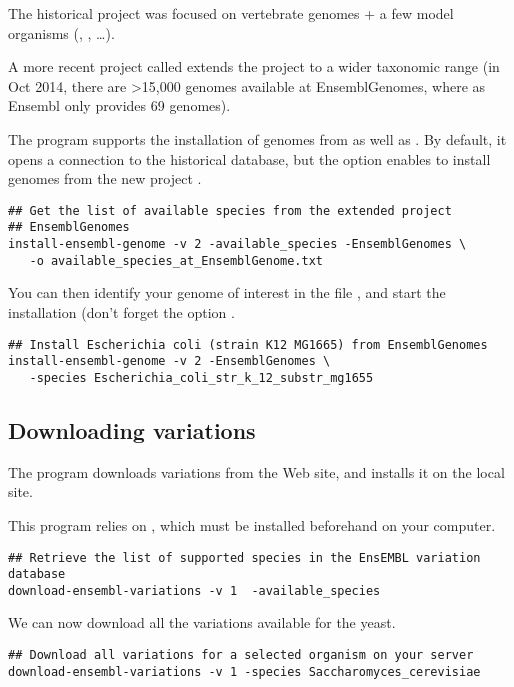 The historical \ensembl project 
was focused on vertebrate genomes + a few model organisms
(, ,
\ldots).

A more recent project called \ensemblgenomes
{} extends the \ensembl project to a
wider taxonomic range (in Oct 2014, there are >15,000 genomes
available at EnsemblGenomes, where as Ensembl only provides 69
genomes).

The program  supports the installation
of genomes from \ensembl as well as \ensemblgenomes. By default, it
opens a connection to the historical \ensembl database, but the option
 enables to install genomes from the new
project \ensemblgenomes.

\begin{lstlisting}
## Get the list of available species from the extended project
## EnsemblGenomes
install-ensembl-genome -v 2 -available_species -EnsemblGenomes \
   -o available_species_at_EnsemblGenome.txt
\end{lstlisting}

You can then identify your genome of interest in the file
, and start the
installation (don't forget the option \option{-ensembl\_genomes}.

\begin{lstlisting}
## Install Escherichia coli (strain K12 MG1665) from EnsemblGenomes
install-ensembl-genome -v 2 -EnsemblGenomes \
   -species Escherichia_coli_str_k_12_substr_mg1655
\end{lstlisting}


\subsection{Downloading variations}
\label{sect:download_ensembl_variations}

The program  downloads variations
from the \ensembl Web site, and installs it on the local \RSAT
site. 

This program relies on , which must be installed
beforehand on your computer.

\begin{lstlisting}
## Retrieve the list of supported species in the EnsEMBL variation database
download-ensembl-variations -v 1  -available_species
\end{lstlisting}

We can now download all the variations available for the yeast.

\begin{lstlisting}
## Download all variations for a selected organism on your server
download-ensembl-variations -v 1 -species Saccharomyces_cerevisiae
\end{lstlisting}
